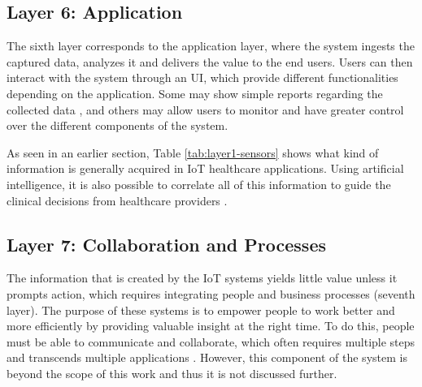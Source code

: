 
\subsection{Layer 6: Application}
\label{sec:iot-model-layer6}

The sixth layer corresponds to the application layer, where the system ingests the captured data, analyzes it and delivers the value to the end users. Users can then interact with the system through an \acf{UI}, which provide different functionalities depending on the application. Some may show simple reports regarding the collected data \cite{Doukas2012, Wu2020}, and others may allow users to monitor and have greater control over the different components of the system. \bigskip

As seen in an earlier section, Table \ref{tab:layer1-sensors} shows what kind of information is generally acquired in \acs{IoT} healthcare applications. Using artificial intelligence, it is also possible to correlate all of this information to guide the clinical decisions from healthcare providers \cite{Gruendner2019, Wagholikar2017, Raposo2021}. \bigskip
\subsection{Layer 7: Collaboration and Processes}
\label{sec:iot-model-layer7}



The information that is created by the \acs{IoT} systems yields little value unless it prompts action, which requires integrating people and business processes (seventh layer). The purpose of these systems is to empower people to work better and more efficiently by providing valuable insight at the right time. To do this, people must be able to communicate and collaborate, which often requires multiple steps and transcends multiple applications \cite{Cisco2014}. However, this component of the system is beyond the scope of this work and thus it is not discussed further.

